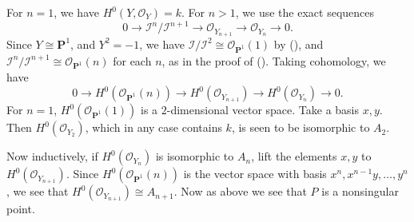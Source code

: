 {For $n=1$, we have $H^0(Y,\mathcal O_Y)=k$. For $n>1$, we use the exact sequences
\[
0\to\mathcal I^n/\mathcal I^{n+1}\to\mathcal O_{Y_{n+1}}\to\mathcal O_{Y_n}\to0.
\]
Since $Y\cong\mathbf P^1$, and $Y^2=-1$, we have $\mathcal I/\mathcal I^2\cong\mathcal O_{\mathbf P^1}(1)$ by (), and $\mathcal I^n/\mathcal I^{n+1}\cong\mathcal O_{\mathbf P^1}(n)$ for each $n$, as in the proof of (). Taking cohomology, we have
\[
0\to H^0(\mathcal O_{\mathbf P^1}(n))\to H^0(\mathcal O_{Y_{n+1}})\to H^0(\mathcal O_{Y_n})\to0.
\]
For $n=1$, $H^0(\mathcal O_{\mathbf P^1}(1))$ is a $2$-dimensional vector space. Take a basis $x,y$. Then $H^0(\mathcal O_{Y_2})$, which in any case contains $k$, is seen to be isomorphic to $A_2$.

Now inductively, if $H^0(\mathcal O_{Y_n})$ is isomorphic to $A_n$, lift the elements $x,y$ to $H^0(\mathcal O_{Y_{n+1}})$. Since $H^0(\mathcal O_{\mathbf P^1}(n))$ is the vector space with basis $x^n,x^{n-1}y,\dots,y^n$, we see that $H^0(\mathcal O_{Y_{n+1}})\cong A_{n+1}$. Now as above we see that $P$ is a nonsingular point.}
